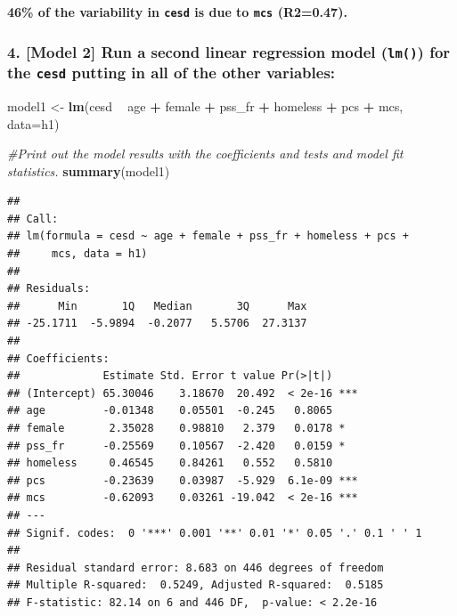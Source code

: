 \documentclass[10pt,letterpaper]{article}
\newenvironment{Shaded}{\begin{snugshade}}{\end{snugshade}}
\newcommand{\KeywordTok}[1]{\textcolor[rgb]{0.13,0.29,0.53}{\textbf{#1}}}
\newcommand{\DataTypeTok}[1]{\textcolor[rgb]{0.13,0.29,0.53}{#1}}
\newcommand{\StringTok}[1]{\textcolor[rgb]{0.31,0.60,0.02}{#1}}
\newcommand{\CommentTok}[1]{\textcolor[rgb]{0.56,0.35,0.01}{\textit{#1}}}
\newcommand{\OperatorTok}[1]{\textcolor[rgb]{0.81,0.36,0.00}{\textbf{#1}}}
\newcommand{\NormalTok}[1]{#1}
\begin{document}
\textbf{46\% of the variability in \texttt{cesd} is due to \texttt{mcs}
(R2=0.47).}

\subsubsection{\texorpdfstring{4. {[}Model 2{]} Run a second linear
regression model (\texttt{lm()}) for the \texttt{cesd} putting in all of
the other
variables:}{4. {[}Model 2{]} Run a second linear regression model (lm()) for the cesd putting in all of the other variables:}}\label{model-2-run-a-second-linear-regression-model-lm-for-the-cesd-putting-in-all-of-the-other-variables}

\begin{Shaded}
\begin{Highlighting}[]
\NormalTok{model1 <-}\StringTok{ }\KeywordTok{lm}\NormalTok{(cesd }\OperatorTok{~}\StringTok{ }\NormalTok{age }\OperatorTok{+}\StringTok{ }\NormalTok{female }\OperatorTok{+}\StringTok{ }\NormalTok{pss_fr }\OperatorTok{+}\StringTok{ }\NormalTok{homeless }\OperatorTok{+}\StringTok{ }\NormalTok{pcs }\OperatorTok{+}\StringTok{ }\NormalTok{mcs, }\DataTypeTok{data=}\NormalTok{h1)}
    
\CommentTok{#Print out the model results with the coefficients and tests and model fit statistics.}
\KeywordTok{summary}\NormalTok{(model1)}
\end{Highlighting}
\end{Shaded}

\begin{verbatim}
## 
## Call:
## lm(formula = cesd ~ age + female + pss_fr + homeless + pcs + 
##     mcs, data = h1)
## 
## Residuals:
##      Min       1Q   Median       3Q      Max 
## -25.1711  -5.9894  -0.2077   5.5706  27.3137 
## 
## Coefficients:
##             Estimate Std. Error t value Pr(>|t|)    
## (Intercept) 65.30046    3.18670  20.492  < 2e-16 ***
## age         -0.01348    0.05501  -0.245   0.8065    
## female       2.35028    0.98810   2.379   0.0178 *  
## pss_fr      -0.25569    0.10567  -2.420   0.0159 *  
## homeless     0.46545    0.84261   0.552   0.5810    
## pcs         -0.23639    0.03987  -5.929  6.1e-09 ***
## mcs         -0.62093    0.03261 -19.042  < 2e-16 ***
## ---
## Signif. codes:  0 '***' 0.001 '**' 0.01 '*' 0.05 '.' 0.1 ' ' 1
## 
## Residual standard error: 8.683 on 446 degrees of freedom
## Multiple R-squared:  0.5249, Adjusted R-squared:  0.5185 
## F-statistic: 82.14 on 6 and 446 DF,  p-value: < 2.2e-16
\end{verbatim}
\end{document}
